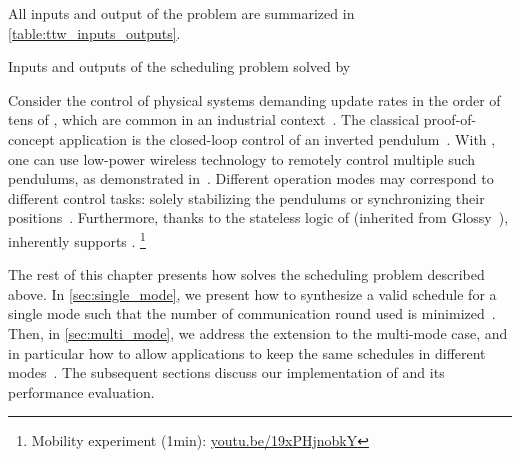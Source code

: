 All inputs and output of the problem are summarized in \cref{table:ttw_inputs_outputs}.

\begin{table}
	\caption{Inputs and outputs of the scheduling problem solved by \TTW}
	\label{table:ttw_inputs_outputs}
	\smaller{}
\end{table}

Consider the control of physical systems demanding update rates in the order of tens of \ms, which are common in an industrial context~\cite{akerberg2011Future}.
The classical proof-of-concept application is the closed-loop control of an inverted pendulum~\cite{boubaker2012inverted}.
With \TTW, one can use low-power wireless technology to remotely control multiple such pendulums, as demonstrated in~\cite{mager2019Feedback}.
Different \TTW operation modes may correspond to different control tasks: \eg solely stabilizing the pendulums or synchronizing their positions~\cite{mager2019Demo}.
Furthermore, thanks to the stateless logic of \TTnet (inherited from Glossy~\cite{ferrari2011Glossy}), \TTW inherently supports .%
%
\footnote{Mobility experiment (1min): \href{https://youtu.be/19xPHjnobkY}{youtu.be/19xPHjnobkY}}

\pagebreak

The rest of this chapter presents how \TTW solves the scheduling problem described above.
In \cref{sec:single_mode}, we present how to synthesize a valid schedule for a single mode such that the number of communication round used is minimized~.
Then, in \cref{sec:multi_mode}, we address the extension to the multi-mode case, and in particular how to allow applications to keep the same schedules in different modes~.
The subsequent sections discuss our implementation of \TTW and its performance evaluation.
